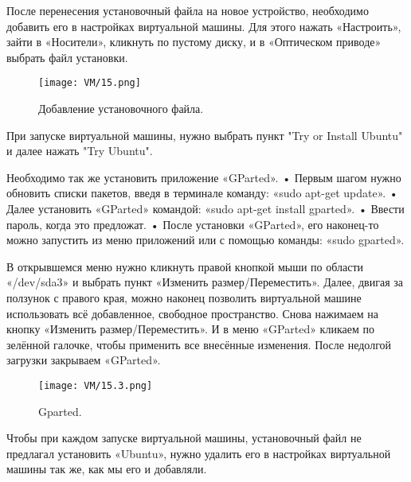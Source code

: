\quad После перенесения установочный файла на новое устройство, необходимо добавить его в настройках виртуальной машины. Для этого нажать «Настроить», зайти в «Носители», кликнуть по пустому диску, и в «Оптическом приводе» выбрать файл установки.

\begin{figure}[h]
		\centering
		\texttt{[image: VM/15.png]}
\caption{Добавление установочного файла.}
\label{ris:image}
\end{figure}

\quad При запуске виртуальной машины, нужно выбрать пункт "Try or Install Ubuntu" и далее нажать "Try Ubuntu". 

\quad Необходимо так же установить приложение «GParted».
\newline \quad • Первым шагом нужно обновить списки пакетов, введя в терминале команду: «sudo apt-get update». 
\newline \quad • Далее установить «GParted» командой: «sudo apt-get install gparted». 
\newline \quad • Ввести пароль, когда это предложат. 
\newline \quad • После установки «GParted», его наконец-то можно запустить из меню приложений или с помощью команды: «sudo gparted». 

\quad В открывшемся меню нужно кликнуть правой кнопкой мыши по области «/dev/sda3» и выбрать пункт «Изменить размер/Переместить». Далее, двигая за ползунок с правого края, можно наконец позволить виртуальной машине использовать всё добавленное, свободное пространство. Снова нажимаем на кнопку «Изменить размер/Переместить». И в меню «GParted»  кликаем по зелённой галочке, чтобы применить все внесённые изменения. После недолгой загрузки закрываем «GParted».

\begin{figure}[h]
		\centering
		\texttt{[image: VM/15.3.png]}
\caption{Gparted.}
\label{ris:image}
\end{figure}

\quad Чтобы при каждом запуске виртуальной машины, установочный файл не предлагал установить «Ubuntu», нужно удалить его в настройках виртуальной машины так же, как мы его и добавляли.
